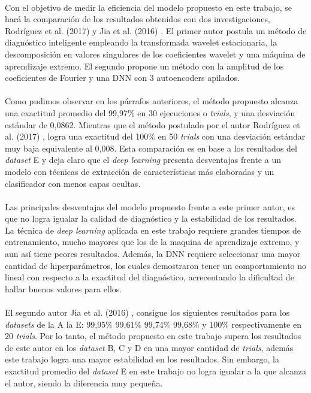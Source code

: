 \documentclass[12pt]{article}%
\begin{document}
\paragraph{}
Con el objetivo de medir la eficiencia del modelo propuesto en este trabajo, se hará la comparación de los resultados obtenidos con dos investigaciones, Rodríguez et al. (2017) \cite{nibaldo} y Jia et al. (2016) \cite{jia} . El primer autor postula un método de diagnóstico inteligente empleando la transformada wavelet estacionaria, la descomposición en valores singulares de los coeficientes wavelet y una máquina de aprendizaje extremo. El segundo propone un método con la amplitud de los coeficientes de Fourier y una DNN con 3 autoencoders apilados.

\paragraph{}
Como pudimos observar en los párrafos anteriores, el método propuesto alcanza una exactitud promedio del 99,97\% en 30 ejecuciones o \textit{trials}, y una desviación estándar de 0,0862. Mientras que el método postulado por el autor Rodríguez et al. (2017) \cite{nibaldo}, logra una exactitud del 100\% en 50 \textit{trials} con una desviación estándar muy baja equivalente al 0,008. Esta comparación es en base a los resultados del \textit{dataset} E y deja claro que el \textit{deep learning} presenta desventajas frente a un modelo con técnicas de extracción de características más elaboradas y un clasificador con menos capas ocultas.

\paragraph{}
Las principales desventajas del modelo propuesto frente a este primer autor, es que no logra igualar la calidad de diagnóstico y la estabilidad de los resultados. La técnica de \textit{deep learning} aplicada en este trabajo requiere grandes tiempos de entrenamiento, mucho mayores que los de la maquina de aprendizaje extremo, y aun así tiene peores resultados. Además, la DNN requiere seleccionar una mayor cantidad de hiperparámetros, los cuales demostraron tener un comportamiento no lineal con respecto a la exactitud del diagnóstico, acrecentando la dificultad de hallar buenos valores para ellos.  

\paragraph{}
El segundo autor Jia et al. (2016) \cite{jia}, consigue los siguientes resultados para los \textit{datasets} de la A la E: 99,95\% 99,61\% 99,74\% 99,68\% y 100\% respectivamente en 20 \textit{trials}. Por lo tanto, el método propuesto en este trabajo supera los resultados de este autor en los \textit{dataset} B, C y D en una mayor cantidad de \textit{trials}, además este trabajo logra una mayor estabilidad en los resultados. Sin embargo, la exactitud promedio del \textit{dataset} E en este trabajo no logra igualar a la que alcanza el autor, siendo la diferencia muy pequeña.
\end{document}
